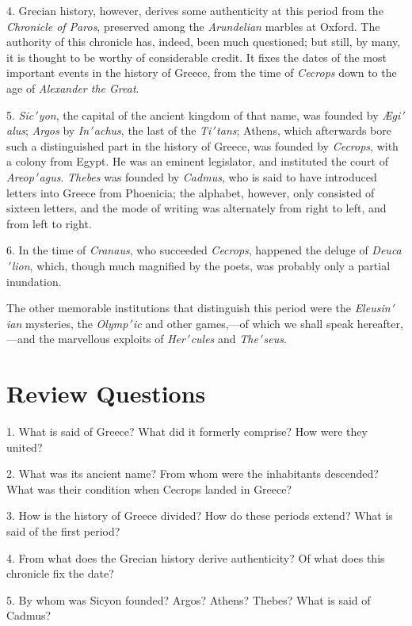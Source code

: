 \documentclass[openany,a4paper]{memoir}
\begin{document}
4. Grecian history, however, derives some authenticity at 
this period from the \emph{Chronicle of Paros}, preserved among 
the \emph{Arundelian} marbles at Oxford. The authority of this 
chronicle has, indeed, been much questioned; but still, by 
many, it is thought to be worthy of considerable credit. It 
fixes the dates of the most important events in the history 
of Greece, from the time of \emph{Cecrops} down to the age of 
\emph{Alexander the Great}. 

5. \emph{Sic$\,'$yon}, the capital of the ancient kingdom of that 
name, was founded by \emph{\AE gi$\,'$alus}; \emph{Argos} by \emph{In$\,'$achus}, the 
last of the \emph{Ti$\,'$tans}; Athens, which afterwards bore such a 
distinguished part in the history of Greece, was founded by 
\emph{Cecrops}, with a colony from Egypt. He was an eminent 
legislator, and instituted the court of \emph{Areop$\,'$agus}. \emph{Thebes} 
was founded by \emph{Cadmus}, who is said to have introduced 
letters into Greece from Phoenicia; the alphabet, however, 
only consisted of sixteen letters, and the mode of writing 
was alternately from right to left, and from left to right. 

6. In the time of \emph{Cranaus}, who succeeded \emph{Cecrops}, happened the deluge of \emph{Deuca$\,'$lion}, which, though much magnified by the poets, was probably only a partial inundation. 

The other memorable institutions that distinguish this 
period were the \emph{Eleusin$\,'$ian} mysteries, the \emph{Olymp$\,'$ic} and 
other games,---of which we shall speak hereafter,---and the 
marvellous exploits of \emph{Her$\,'$cules} and \emph{The$\,'$seus}. 


\section{Review Questions}

1. What is said of Greece? What did it formerly comprise? How were they united?

2. What was its ancient name? From 
whom were the inhabitants descended? What was their condition when 
Cecrops landed in Greece? 

3. How is the history of Greece divided? How do these periods extend? What is said of the first period? 

4. From what does the Grecian 
history derive authenticity? Of what does this chronicle fix the date?  

5. By whom was Sicyon founded? Argos? Athens? Thebes? What is 
said of Cadmus?  
\end{document}
